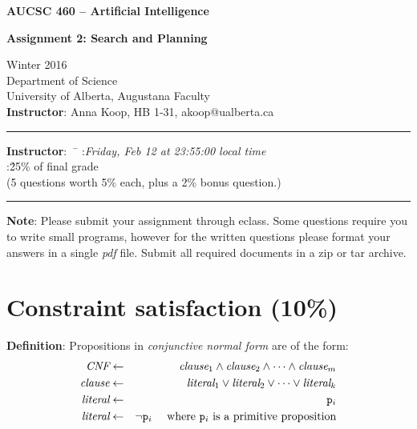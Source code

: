 \documentclass[12pt]{article}
\begin{document}
\noindent
{\Large\bf AUCSC 460 -- Artificial Intelligence}

\vspace*{1\baselineskip}

\noindent
{\large\bf Assignment 2: Search and Planning}

\vspace*{1\baselineskip}

\noindent
Winter 2016\\
Department of Science\\
University of Alberta, Augustana Faculty\\
{\bf Instructor}: Anna Koop, HB 1-31, akoop@ualberta.ca

\vspace*{1.75\baselineskip}
\hrule

\begin{tabbing}
{\bf Instructor}:\ \ \=\kill
{}:\'{\em Friday, Feb 12 at 23:55:00 local time}
\\
:\' 25\% of final grade \\
\>(5 questions worth 5\% each, plus a 2\% bonus question.)
\end{tabbing}

\hrule

\vspace*{1.25\baselineskip}

\noindent
{\bf Note}:
Please submit your assignment through eclass. Some questions require you to write small programs,
however for the written questions please format your answers
in a single {\em pdf\/} file.
Submit all required documents in a zip or tar archive.


\section{Constraint satisfaction \rm(10\%)}

\vspace*{1\baselineskip}
{\bf Definition}:
Propositions in {\em conjunctive normal form\/} are of the form:
\begin{eqnarray*}
\mbox{\em CNF} & \leftarrow & 
\mbox{\em clause}_1 
\wedge
\mbox{\em clause}_2 
\wedge
\cdots
\wedge
\mbox{\em clause}_m 
\\
\mbox{\em clause} & \leftarrow & 
\mbox{\em literal}_1 
\vee
\mbox{\em literal}_2 
\vee
\cdots
\vee
\mbox{\em literal}_k 
\\
\mbox{\em literal} & \leftarrow & {\tt p}_i
\\
\mbox{\em literal} & \leftarrow & \neg {\tt p}_i
\quad
\mbox{ where } {\tt p}_i \mbox{ is a primitive proposition}
\end{eqnarray*}
\end{document}
